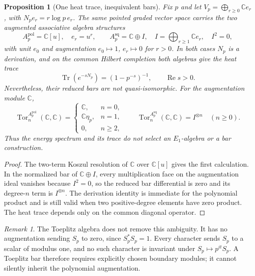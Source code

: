 \documentclass[11pt]{article}
\theoremstyle{plain}
\newtheorem{proposition}[theorem]{Proposition}
\theoremstyle{definition}
\theoremstyle{remark}
\newtheorem{remark}[theorem]{Remark}
\begin{document}
\begin{proposition}[One heat trace, inequivalent bars]
\label{prop:two-bars}
Fix \(p\) and let
\(V_p=\bigoplus_{r\geq0}\mathbb C e_r\), with
\(N_pe_r=r\log p\,e_r\).  The same pointed graded vector space carries the
two augmented associative algebra structures
\[
 A_p^{\mathrm{pol}}=\mathbb C[u],\quad e_r=u^r,
 \qquad
 A_p^{\mathrm{sq}}=\mathbb C\oplus I,\quad
 I=\bigoplus_{r\geq1}\mathbb C e_r,\quad I^2=0,
\]
with unit \(e_0\) and augmentation \(e_0\mapsto1\),
\(e_r\mapsto0\) for \(r>0\).  In both cases \(N_p\) is a derivation, and
on the common Hilbert completion both algebras give the heat trace
\[
 \operatorname{Tr}(e^{-sN_p})=(1-p^{-s})^{-1},
 \qquad \operatorname{Re}s>0.
\]
Nevertheless, their reduced bars are not quasi-isomorphic.  For the
augmentation module \(\mathbb C\),
\[
 \operatorname{Tor}^{A_p^{\mathrm{pol}}}_n(\mathbb C,\mathbb C)
 =\begin{cases}
   \mathbb C,&n=0,\\
   \mathbb C\eta_p,&n=1,\\
   0,&n\geq2,
  \end{cases}
 \qquad
 \operatorname{Tor}^{A_p^{\mathrm{sq}}}_n(\mathbb C,\mathbb C)
 =I^{\otimes n}\quad(n\geq0).
\]
Thus the energy spectrum and its trace do not select an \(E_1\)-algebra or
a bar construction.
\end{proposition}

\begin{proof}
The two-term Koszul resolution of \(\mathbb C\) over \(\mathbb C[u]\)
gives the first calculation.  In the normalized bar of
\(\mathbb C\oplus I\), every multiplication face on the augmentation ideal
vanishes because \(I^2=0\), so the reduced bar differential is zero and its
degree-\(n\) term is \(I^{\otimes n}\).  The derivation identity is immediate
for the polynomial product and is still valid when two positive-degree
elements have zero product.  The heat trace depends only on the common
diagonal operator.
\end{proof}

\begin{remark}
The Toeplitz algebra does not remove this ambiguity.  It has no augmentation
sending \(S_p\) to zero, since \(S_p^*S_p=1\).  Every character sends
\(S_p\) to a scalar of modulus one, and no such character is invariant under
\(S_p\mapsto p^{it}S_p\).  A Toeplitz bar therefore requires explicitly
chosen boundary modules; it cannot silently inherit the polynomial
augmentation.
\end{remark}
\end{document}
